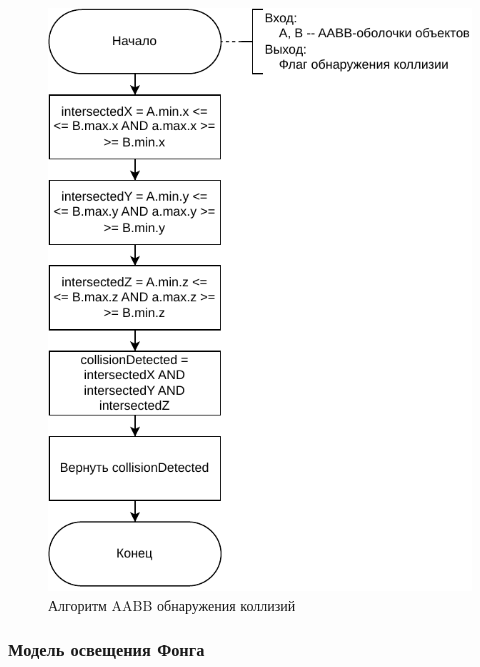 \begin{figure}[H]
	\centering
	\includegraphics[scale=1]{diag/aabb.pdf}
	\caption{Алгоритм AABB обнаружения коллизий}
	\label{fig:aabb}
\end{figure}



\subsubsection{Модель освещения Фонга}

